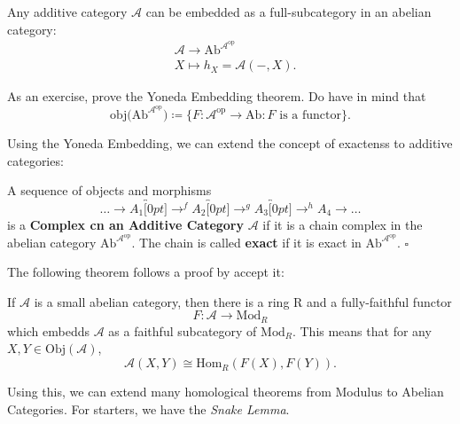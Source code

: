 \documentclass[../category_theory.tex]{subfiles}
\begin{document}
\begin{theorem*}
	Any additive category \(\mathcal{A}\) can be embedded as a full-subcategory in an abelian category:
	\begin{align*}
		 & \mathcal{A}\rightarrow \mathrm{Ab}^{\mathcal{A}^{\mathrm{op}}} \\
		 & X\mapsto h_{X}=\mathcal{A}(-, X).
	\end{align*}
\end{theorem*}
\begin{exr}
	As an exercise, prove the Yoneda Embedding theorem. Do have in mind that
	\[
		\mathrm{obj}\biggl(\mathrm{Ab}^{\mathcal{A}^{\mathrm{op}}}\biggr)\coloneqq \{F:\mathcal{A}^{\mathrm{op}}\rightarrow \mathrm{Ab}: F \text{ is a functor}\}.
	\]
\end{exr}
Using the Yoneda Embedding, we can extend the concept of exactenss to additive categories:
\begin{def*}
	A sequence of objects and morphisms
	\[
		\dotsc \longrightarrow A_{1}\overbracket[0pt]{\longrightarrow}^{f} A_{2}\overbracket[0pt]{\longrightarrow}^{g} A_{3}\overbracket[0pt]{\longrightarrow}^{h} A_{4}\longrightarrow \dotsc
	\]
	is a \textbf{Complex cn an Additive Category} \(\mathcal{A}\) if it is a chain complex in the abelian category \(\mathrm{Ab}^{\mathcal{A}^{\mathrm{op}}}\). The chain is called \textbf{exact} if it is exact in \(\mathrm{Ab}^{\mathcal{A}^{\mathrm{op}}}\). \(\square\)
\end{def*}
The following theorem follows a proof by accept it:
\begin{theorem*}
	If \(\mathcal{A}\) is a small abelian category, then there is a ring R and a fully-faithful functor
	\[
		F:\mathcal{A}\rightarrow \mathrm{Mod}_{R}
	\]
	which embedds \(\mathcal{A}\) as a faithful subcategory of \(\mathrm{Mod}_{R}.\) This means that for any \(X, Y\in \mathrm{Obj}(\mathcal{A})\),
	\[
		\mathcal{A}(X, Y)\cong \mathrm{Hom}_{R}(F(X), F(Y)).
	\]
\end{theorem*}
Using this, we can extend many homological theorems from Modulus to Abelian Categories. For starters, we have the \textit{Snake Lemma}.
\end{document}
